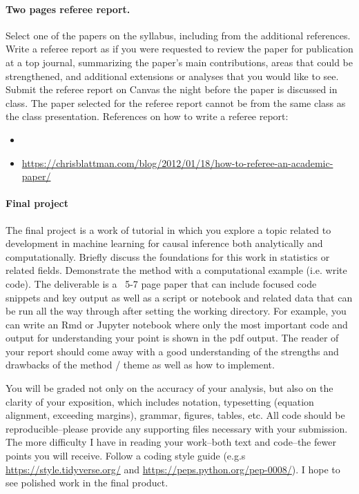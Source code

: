 \documentclass[letterpaper, 12pt, parskip=full,DIV=10]{scrartcl}
\begin{document}
\paragraph{Two pages referee report.}
Select one of the papers on the syllabus, including from the additional references. Write a referee report as if you were requested to review the paper for publication at a top journal, summarizing the paper's main contributions, areas that could be strengthened, and additional extensions or analyses that you would like to see. Submit the referee report on Canvas the night before the paper is discussed in class. The paper selected for the referee report cannot be from the same class as the class presentation. 
References on how to write a referee report:
\begin{itemize}
\item {}
 \item \url{https://chrisblattman.com/blog/2012/01/18/how-to-referee-an-academic-paper/}
 \end{itemize}

\paragraph{Final project}
The final project is a work of tutorial in which you explore a topic related to development in machine learning for causal inference both analytically and computationally.  Briefly discuss the foundations for this work in statistics or related fields. Demonstrate the method with a computational example (i.e. write code). The deliverable is a ~5-7 page paper that can include focused code snippets and key output as well as a script or notebook and related data that can be run all the way through after setting the working directory. For example, you can write an Rmd or Jupyter notebook where only the most important code and output for understanding your point is shown in the pdf output.  The reader of your report should come away with a good understanding of the strengths and drawbacks of the method / theme as well as how to implement.

You will be graded not only on the accuracy of your analysis, but also on the clarity of your exposition, which includes notation, typesetting (equation alignment, exceeding margins), grammar, figures, tables, etc. All code should be reproducible--please provide any supporting files necessary with your submission. 
The more difficulty I have in reading your work--both text and code--the fewer points you will receive. Follow a coding style guide  (e.g.s \url{https://style.tidyverse.org/} and \url{https://peps.python.org/pep-0008/}). I hope to see polished work in the final product.
\end{document}
